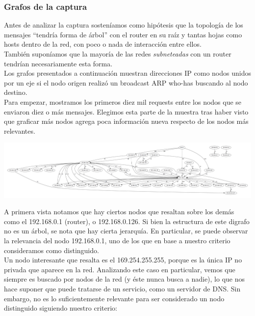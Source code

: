\subsubsection{Grafos de la captura}

\indent \indent Antes de analizar la captura sosteníamos como hipótesis que la topología de los mensajes ``tendría forma de árbol'' con el router en su raíz y tantas hojas como hosts dentro de la red, con poco o nada de interacción entre ellos.\\
\indent También suponíamos que la mayoría de las redes \textit{subneteadas} con un router tendrían necesariamente esta forma.\\
\indent Los grafos presentados a continuación muestran direcciones IP como nodos unidos por un eje si el nodo origen realizó un broadcast ARP who-has buscando al nodo destino.\\
\indent Para empezar, mostramos los primeros diez mil requests entre los nodos que se enviaron diez o más mensajes. Elegimos esta parte de la muestra tras haber visto que graficar más nodos agrega poca información nueva respecto de los nodos más relevantes.\\

\begin{center}
\includegraphics[scale=0.25,angle=90]{graphics/t-work-10000c-10w.png}
\end{center}

\indent A primera vista notamos que hay ciertos nodos que resaltan sobre los demás como el 192.168.0.1 (router), o 192.168.0.126. Si bien la estructura de este digrafo no es un árbol, se nota que hay cierta jerarquía. En particular, se puede observar la relevancia del nodo 192.168.0.1, uno de los que en base a nuestro criterio consideramos como distinguido.\\
\indent Un nodo interesante que resalta es el 169.254.255.255, porque es la única IP no privada que aparece en la red. Analizando este caso en particular, vemos que siempre es buscado por nodos de la red (y éste nunca busca a nadie), lo que nos hace suponer que puede tratarse de un servicio, como un servidor de DNS. Sin embargo, no es lo suficientemente relevante para ser considerado un nodo distinguido siguiendo nuestro criterio:\\


